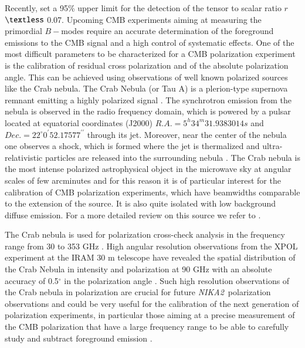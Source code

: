 \documentclass[twocolumn,traditabstract]{aa}
\def\NIKAd{\textit{NIKA2}}
\begin{document}
Recently, \citet{bicepplanck2015,bicep2016} set a 95\% upper limit for the
detection of the tensor to scalar ratio $r$ $\textless$ 0.07.  Upcoming CMB
experiments aiming at measuring the primordial $B-$modes require an accurate
determination of the foreground emissions to the CMB signal and a high control
of systematic effects. One of the most difficult parameters to be characterized
for a CMB polarization experiment is the calibration of residual cross
polarization and of the absolute polarization angle. This can be achieved using
observations of well known polarized sources like the Crab nebula. The Crab
Nebula (or Tau A) is a plerion-type supernova remnant emitting a highly
polarized signal \citep{1978A&A....70..419W,1991ApJ...368..463M}.  The
synchrotron emission from the nebula is observed in the radio frequency domain,
which is powered by a pulsar located at equatorial coordinates (J2000) $R.A. =
5^h34^m31.9383014s$ and $Dec. = 22^{\circ}0^{\prime}52.17577^{\prime\prime}$ \citep{Lobanov} through its jet.
Moreover, near the center of the nebula one observes a shock, which is formed
where the jet is thermalized and ultra-relativistic particles are released into
the surrounding nebula \citep{2000ApJ...536L..81W,2011A&A...528A..11W}. The Crab
nebula is the most intense polarized astrophysical object in the microwave sky
at angular scales of few arcminutes and for this reason it is of particular
interest for the calibration of CMB polarization experiments, which have
beamwidths comparable to the extension of the source. It is also quite isolated
with low background diffuse emission. For a more detailed review on this source
we refer to \citet{2008ARA&A..46..127H}.

The Crab nebula is used for polarization cross-check analysis in the frequency
range from 30 to 353 GHz \citep{2011ApJS..192...19W,2015arXiv150702058P}. High
angular resolution observations from the XPOL experiment \citep{thum2008} at the
IRAM 30 m telescope have revealed the spatial distribution of the Crab Nebula in
intensity and polarization at 90 GHz with an absolute accuracy of 0.5$^{\circ}$
in the polarization angle \citep{aumont2010}. Such high resolution observations
of the Crab nebula in polarization are crucial for future \NIKAd\ polarization
observations and could be very useful for the calibration of the next generation
of polarization experiments, in particular those aiming at a precise measurement
of the CMB polarization that have a large frequency range to be able to
carefully study and subtract foreground emission \citep{2016IJMPD..2540008K}.
\end{document}
